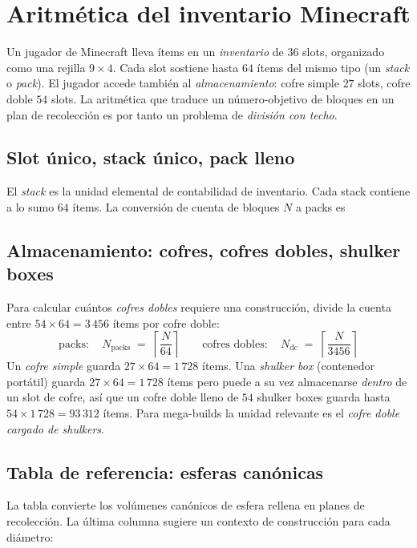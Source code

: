\documentclass[12pt,a4paper]{scrartcl}
\begin{document}
\clearpage

\section{Aritmética del inventario Minecraft}

Un jugador de Minecraft lleva ítems en un \emph{inventario} de 36 slots, organizado como una rejilla $9 \times 4$. Cada slot sostiene hasta $64$ ítems del mismo tipo (un \emph{stack} o \emph{pack}). El jugador accede también al \emph{almacenamiento}: cofre simple $27$ slots, cofre doble $54$ slots. La aritmética que traduce un número-objetivo de bloques en un plan de recolección es por tanto un problema de \emph{división con techo}.

\subsection{Slot único, stack único, pack lleno}
El \emph{stack} es la unidad elemental de contabilidad de inventario. Cada stack contiene a lo sumo $64$ ítems. La conversión de cuenta de bloques $N$ a packs es

\subsection{Almacenamiento: cofres, cofres dobles, shulker boxes}
Para calcular cuántos \emph{cofres dobles} requiere una construcción, divide la cuenta entre $54 \times 64 = 3\,456$ ítems por cofre doble:
\[
\text{packs}:\quad N_{\mathrm{packs}} \;=\; \left\lceil \dfrac{N}{64} \right\rceil
\qquad
\text{cofres dobles}:\quad N_{\mathrm{dc}} \;=\; \left\lceil \dfrac{N}{3456} \right\rceil
\]
Un \emph{cofre simple} guarda $27 \times 64 = 1\,728$ ítems. Una \emph{shulker box} (contenedor portátil) guarda $27 \times 64 = 1\,728$ ítems pero puede a su vez almacenarse \emph{dentro} de un slot de cofre, así que un cofre doble lleno de $54$ shulker boxes guarda hasta $54 \times 1\,728 = 93\,312$ ítems. Para mega-builds la unidad relevante es el \emph{cofre doble cargado de shulkers}.

\subsection{Tabla de referencia: esferas canónicas}
La tabla convierte los volúmenes canónicos de esfera rellena en planes de recolección. La última columna sugiere un contexto de construcción para cada diámetro:
\nopagebreak
\end{document}
